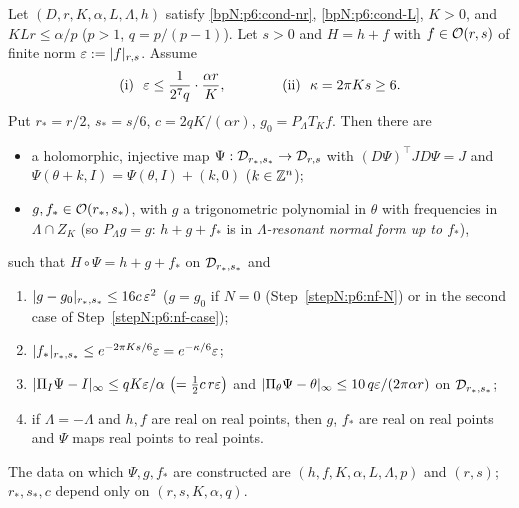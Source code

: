 \begin{theorem}\label{bpN:p6:normal-form}
Let $(D,r,K,\alpha,L,\Lambda,h)$ satisfy \ref{bpN:p6:cond-nr}, \ref{bpN:p6:cond-L}, $K>0$, and $KLr\le\alpha/p$ ($p>1$, $q=p/(p-1)$). Let $s>0$ and $H=h+f$ with $f\in\mathcal O(r,s)$ of finite norm $\varepsilon:=\lvert f\rvert_{r,s}$. Assume
\[\textup{(i)}\ \ \varepsilon\le\frac1{2^7q}\cdot\frac{\alpha r}K,\qquad\qquad\textup{(ii)}\ \ \kappa=2\pi Ks\ge6 .\]
Put $r_*=r/2$, $s_*=s/6$, $c=2qK/(\alpha r)$, $g_0=P_\Lambda T_Kf$. Then there are
\begin{itemize}
\item a holomorphic, injective map $\Psi:\mathcal D_{r_*,s_*}\to\mathcal D_{r,s}$ with $(D\Psi)^\top JD\Psi=J$ and $\Psi(\theta+k,I)=\Psi(\theta,I)+(k,0)$ ($k\in\mathbb{Z}^n$);
\item $g,f_*\in\mathcal O(r_*,s_*)$, with $g$ a trigonometric polynomial in $\theta$ with frequencies in $\Lambda\cap Z_K$ (so $P_\Lambda g=g$: $h+g+f_*$ is in \emph{$\Lambda$-resonant normal form up to $f_*$}),
\end{itemize}
such that $H\circ\Psi=h+g+f_*$ on $\mathcal D_{r_*,s_*}$ and
\begin{enumerate}[label=(\alph*)]
\item $\lvert g-g_0\rvert_{r_*,s_*}\le16c\,\varepsilon^2$ \quad ($g=g_0$ if $N=0$ (Step~\ref{stepN:p6:nf-N}) or in the second case of Step~\ref{stepN:p6:nf-case});
\item $\lvert f_*\rvert_{r_*,s_*}\le e^{-2\pi Ks/6}\varepsilon=e^{-\kappa/6}\varepsilon$;
\item $\lvert \Pi_I\Psi-I\rvert_\infty\le qK\varepsilon/\alpha\ \bigl(=\tfrac12c\,r\varepsilon\bigr)$ and $\lvert \Pi_\theta\Psi-\theta\rvert_\infty\le10\,q\varepsilon/(2\pi\alpha r)$ on $\mathcal D_{r_*,s_*}$;
\item if $\Lambda=-\Lambda$ and $h,f$ are real on real points, then $g$, $f_*$ are real on real points and $\Psi$ maps real points to real points.
\end{enumerate}
The data on which $\Psi,g,f_*$ are constructed are $(h,f,K,\alpha,L,\Lambda,p)$ and $(r,s)$; $r_*,s_*,c$ depend only on $(r,s,K,\alpha,q)$.
\end{theorem}
